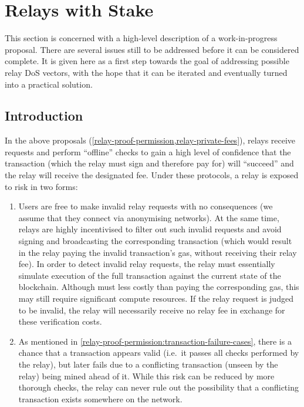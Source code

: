 
\chapter{Relays with Stake}\label{relay-stake}

\newcommand{\stakecontract}{\ensuremath{\contractstyle{RelayStake}}\xspace}
\newcommand{\prs}{\pi_{\constantstyle{\req}}}

\begin{notebox}
  This section is concerned with a high-level description of a work-in-progress proposal. There are several issues still to be addressed before it can be considered complete.  It is given here as a first step towards the goal of addressing possible relay DoS vectors, with the hope that it can be iterated and eventually turned into a practical solution.
\end{notebox}

\section{Introduction}\label{relay-stake:introduction}
In the above proposals (\cref{relay-proof-permission,relay-private-fees}), relays receive requests and perform ``offline'' checks to gain a high level of confidence that the transaction (which the relay must sign and therefore pay for) will ``succeed'' and the relay will receive the designated fee. Under these protocols, a relay is exposed to risk in two forms:
\begin{enumerate}
\item\label{relay-stake:introduction:risk-validation-cost} Users are free to make invalid relay requests with no consequences (we assume that they connect via anonymising networks). At the same time, relays are highly incentivised to filter out such invalid requests and avoid signing and broadcasting the corresponding transaction (which would result in the relay paying the invalid transaction's gas, without receiving their relay fee). In order to detect invalid relay requests, the relay must essentially simulate execution of the full transaction against the current state of the blockchain. Although must less costly than paying the corresponding gas, this may still require significant compute resources. If the relay request is judged to be invalid, the relay will necessarily receive no relay fee in exchange for these verification costs.
\item As mentioned in \cref{relay-proof-permission:transaction-failure-cases}, there is a chance that a transaction appears valid (i.e.~it passes all checks performed by the relay), but later fails due to a conflicting transaction (unseen by the relay) being mined ahead of it. While this risk can be reduced by more thorough checks, the relay can never rule out the possibility that a conflicting transaction exists somewhere on the network.
\end{enumerate}

